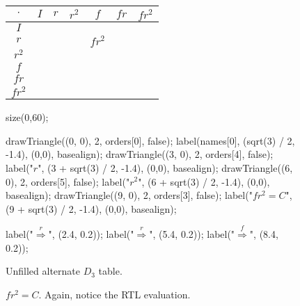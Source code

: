 \documentclass[../textbook.tex]{subfiles}
\begin{document}
\begin{figure}[h]
	\begin{center}
		\begin{minipage}[b]{0.35\textwidth}
			\centering
			\begin{tabular}{c|cccccc}
				\hline
				$\cdot$ & $I$ & $r$ & $r^2$ & $f$ & $fr$ & $fr^2$ \\ \hline
				\rowcolor{light-gray}
				$I$    &   &   &   &   &   &   \\ 
				$r$    &   &   &   & $fr^2$  &   &   \\ 
				\rowcolor{light-gray}
				$r^2$    &   &   &   &   &   &   \\ 
				$f$    &   &   &   &   &   &   \\ 
				\rowcolor{light-gray}
				$fr$    &   &   &   &   &   &   \\ 
				$fr^2$    &   &   &   &   &   &   \\ \hline
			\end{tabular}
			\vspace*{0.5\baselineskip}
		\end{minipage}
		\hfill
		\begin{minipage}[b]{0.55\textwidth}
			\centering
			\begin{asy}[width=\textwidth]
			size(0,60);
			
			drawTriangle((0, 0), 2, orders[0], false);
			label(names[0], (sqrt(3) / 2, -1.4), (0,0), basealign);
			drawTriangle((3, 0), 2, orders[4], false);
			label("$r$", (3 + sqrt(3) / 2, -1.4), (0,0), basealign);
			drawTriangle((6, 0), 2, orders[5], false);
			label("$r^2$", (6 + sqrt(3) / 2, -1.4), (0,0), basealign);
			drawTriangle((9, 0), 2, orders[3], false);
			label("$fr^2=C$", (9 + sqrt(3) / 2, -1.4), (0,0), basealign);
			
			label("$\stackrel{r}{\Longrightarrow}$", (2.4, 0.2));
			label("$\stackrel{r}{\Longrightarrow}$", (5.4, 0.2));
			label("$\stackrel{f}{\Longrightarrow}$", (8.4, 0.2));
			\end{asy}
		\end{minipage}
	\end{center}
	\vspace*{-2\baselineskip}
	\begin{center}
		\begin{minipage}[t]{0.35\textwidth}
			\caption{Unfilled alternate $D_3$ table.}
			\label{fig:alttable}
		\end{minipage}
		\hfill
		\begin{minipage}[t]{0.55\textwidth}
			\caption{$fr^2=C$. Again, notice the RTL evaluation.}
			\label{fig:fr2}
		\end{minipage}
	\end{center}
	\vspace*{-2\baselineskip}
\end{figure}
\end{document}

